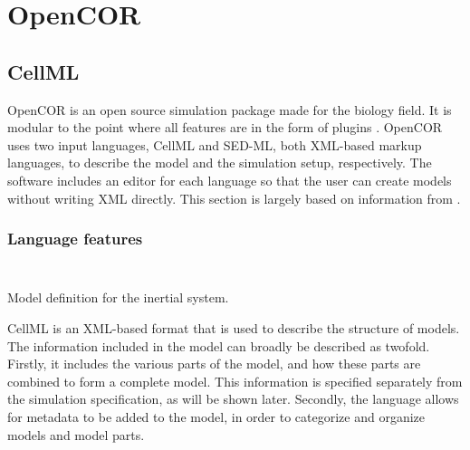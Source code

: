 \documentclass[\rootfolder/main.tex]{subfiles}
\begin{document}
\chapter{OpenCOR} %

\label{Chapter04} %

\section{CellML}

OpenCOR is an open source simulation package made for the biology field.
It is modular to the point where all features are in the form of plugins \cite{10.3389/fphys.2015.00026}.
OpenCOR uses two input languages, CellML and SED-ML, both XML-based markup languages, to describe the model and the simulation setup, respectively.
The software includes an editor for each language so that the user can create models without writing XML directly.
This section is largely based on information from \cite{cuellar2003}.

\subsection{Language features}

\begin{wraptable}{R}{0.5\columnwidth}
    \inputminted[lastline=27]{cellml}{\rootfolder/Models/OpenCOR/Inertial.input}
\end{wraptable}

\begin{listing}[ht]
    \inputminted[firstline=28]{cellml}{\rootfolder/Models/OpenCOR/Inertial.input}
    \caption{Model definition for the inertial system.\label{lst:cellml-inertial-model}}
\end{listing}

CellML is an XML-based format that is used to describe the structure of models.
The information included in the model can broadly be described as twofold.
Firstly, it includes the various parts of the model, and how these parts are combined to form a complete model.
This information is specified separately from the simulation specification, as will be shown later.
Secondly, the language allows for metadata to be added to the model, in order to categorize and organize models and model parts.
\end{document}
